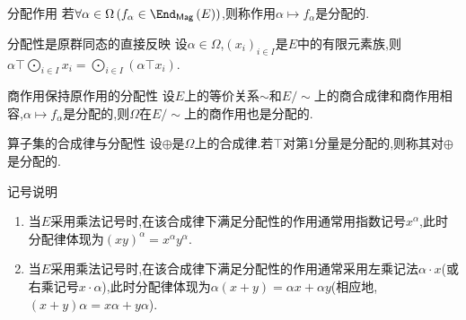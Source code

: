\begin{definition}{分配作用}{}
	若$\forall\alpha\in\Omega\left(f_{\alpha}\in\End_{\mathsf{Mag}}\left(E\right)\right)$,则称作用$\alpha\mapsto f_{\alpha}$是分配的.
\end{definition}

\begin{theorem}{分配性是原群同态的直接反映}{}
	设$\alpha\in\Omega$,$\left(x_{i}\right)_{i\in I}$是$E$中的有限元素族,则$\alpha\top\bigodot\limits_{i\in I}x_{i}=\bigodot\limits_{i\in I}\left(\alpha\top x_{i}\right)$.
\end{theorem}

\begin{theorem}{商作用保持原作用的分配性}{}
	设$E$上的等价关系$\sim$和$E/\sim$上的商合成律和商作用相容,$\alpha\mapsto f_{\alpha}$是分配的,则$\Omega$在$E/\sim$上的商作用也是分配的.
\end{theorem}

\begin{definition}{算子集的合成律与分配性}{}
	设$\oplus$是$\Omega$上的合成律.若$\top$对第$1$分量是分配的,则称其对$\oplus$是分配的.
\end{definition}

\begin{remark}{记号说明}{}
	\begin{enumerate}
		\item 当$E$采用乘法记号时,在该合成律下满足分配性的作用通常用指数记号$x^{\alpha}$,此时分配律体现为$\left(xy\right)^{\alpha}=x^{\alpha}y^{\alpha}$.
		\item 当$E$采用乘法记号时,在该合成律下满足分配性的作用通常采用左乘记法$\alpha\cdot x$(或右乘记号$x\cdot\alpha$),此时分配律体现为$\alpha\left(x+y\right)=\alpha x + \alpha y$(相应地,$\left(x+y\right)\alpha = x\alpha + y\alpha$).
	\end{enumerate}
\end{remark}




